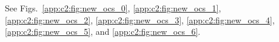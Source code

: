 \begin{table}
\begin{tabular}{c c c l}
\end{tabular}


\end{table}

\section{}\label{app:c2:new_oc_plots}

See Figs.~\ref{app:c2:fig:new_ocs_0}, \ref{app:c2:fig:new_ocs_1}, \ref{app:c2:fig:new_ocs_2}, \ref{app:c2:fig:new_ocs_3}, \ref{app:c2:fig:new_ocs_4}, \ref{app:c2:fig:new_ocs_5}, and \ref{app:c2:fig:new_ocs_6}.

